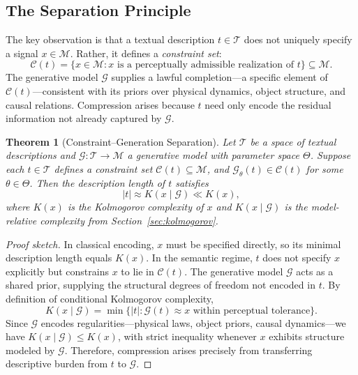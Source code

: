 \documentclass[11pt,a4paper]{article}
\newtheorem{theorem}{Theorem}[section]
\theoremstyle{definition}
\theoremstyle{remark}
\begin{document}
\subsection{The Separation Principle}

The key observation is that a textual description $t \in \mathcal{T}$ does not uniquely specify a signal $x \in \mathcal{M}$. Rather, it defines a \emph{constraint set}:
\[
\mathcal{C}(t) = \{ x \in \mathcal{M} : x \text{ is a perceptually admissible realization of } t \} \subseteq \mathcal{M}.
\]
The generative model $\mathcal{G}$ supplies a lawful completion---a specific element of $\mathcal{C}(t)$---consistent with its priors over physical dynamics, object structure, and causal relations. Compression arises because $t$ need only encode the residual information not already captured by $\mathcal{G}$.

\begin{theorem}[Constraint--Generation Separation]
\label{thm:cg_separation}
Let $\mathcal{T}$ be a space of textual descriptions and $\mathcal{G} : \mathcal{T} \rightarrow \mathcal{M}$ a generative model with parameter space $\Theta$. Suppose each $t \in \mathcal{T}$ defines a constraint set $\mathcal{C}(t) \subseteq \mathcal{M}$, and $\mathcal{G}_\theta(t) \in \mathcal{C}(t)$ for some $\theta \in \Theta$. Then the description length of $t$ satisfies
\[
|t| \approx K(x \mid \mathcal{G}) \ll K(x),
\]
where $K(x)$ is the Kolmogorov complexity of $x$ and $K(x \mid \mathcal{G})$ is the model-relative complexity from Section~\ref{sec:kolmogorov}.
\end{theorem}

\begin{proof}[Proof sketch]
In classical encoding, $x$ must be specified directly, so its minimal description length equals $K(x)$. In the semantic regime, $t$ does not specify $x$ explicitly but constrains $x$ to lie in $\mathcal{C}(t)$. The generative model $\mathcal{G}$ acts as a shared prior, supplying the structural degrees of freedom not encoded in $t$. By definition of conditional Kolmogorov complexity,
\[
K(x \mid \mathcal{G}) = \min\{ |t| : \mathcal{G}(t) \approx x \text{ within perceptual tolerance} \}.
\]
Since $\mathcal{G}$ encodes regularities---physical laws, object priors, causal dynamics---we have $K(x \mid \mathcal{G}) \le K(x)$, with strict inequality whenever $x$ exhibits structure modeled by $\mathcal{G}$. Therefore, compression arises precisely from transferring descriptive burden from $t$ to $\mathcal{G}$.
\end{proof}
\end{document}
